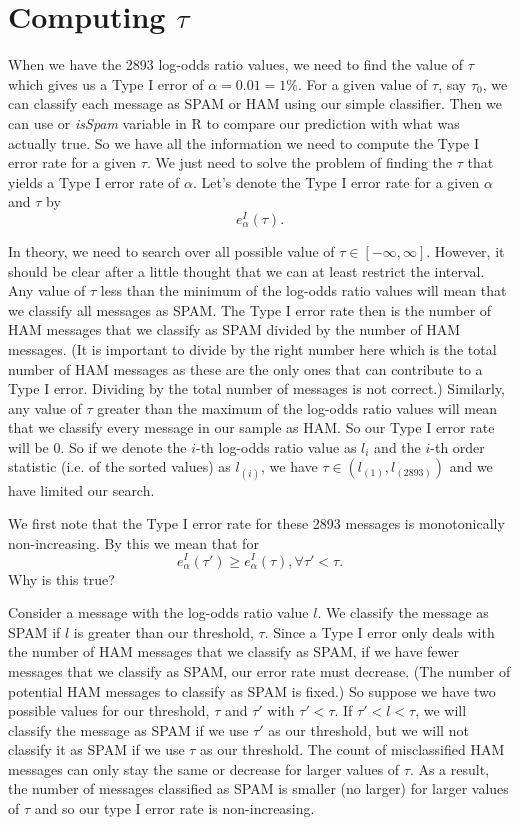 \documentclass{article}
\def\SVariable#1{\textsl{#1}}
\begin{document}
\section{Computing $\tau$}

When we have the 2893 log-odds ratio values, we need to find the value
of $\tau$ which gives us a Type I error of $\alpha = 0.01 = 1\%$.  For
a given value of $\tau$, say $\tau_0$, we can classify each message as
SPAM or HAM using our simple classifier.  Then we can use or
\SVariable{isSpam} variable in R to compare our prediction with what
was actually true.  So we have all the information we need to compute
the Type I error rate for a given $\tau$. We just need to solve the
problem of finding the $\tau$ that yields a Type I error rate of
$\alpha$.
Let's denote the Type I error  rate for a given 
$\alpha$ and $\tau$ by
$$ e_\alpha^I(\tau).$$

In theory, we need to search over all possible value of $\tau \in
[-\infty, \infty]$.  However, it should be clear after a little
thought that we can at least restrict the interval.  Any value of
$\tau$ less than the minimum of the log-odds ratio values will mean
that we classify all messages as SPAM. The Type I error rate then is
the number of HAM messages that we classify as SPAM divided by the
number of HAM messages.  (It is important to divide by the right
number here which is the total number of HAM messages as these are the
only ones that can contribute to a Type I error.  Dividing by the
total number of messages is not correct.)  Similarly, any value of
$\tau$ greater than the maximum of the log-odds ratio values will mean
that we classify every message in our sample as HAM. So our Type I
error rate will be $0$.  So if we denote the $i$-th log-odds ratio
value as $l_{i}$ and the $i$-th order statistic (i.e. of the sorted
values) as $l_{(i)}$, we have $\tau \in (l_{(1)}, l_{(2893)})$
and we have limited our search.

We first note that the Type I error rate for these 2893 messages is
monotonically non-increasing.  By this we mean that for
$$
  e_\alpha^I(\tau') \ge 
  e_\alpha^I(\tau),
\forall \tau' < \tau.
$$ Why is this true? 

Consider a message with the log-odds ratio value $l$.  We classify the
message as SPAM if $l$ is greater than our threshold, $\tau$.  Since a
Type I error only deals with the number of HAM messages that we
classify as SPAM, if we have fewer messages that we classify as SPAM,
our error rate must decrease. (The number of potential HAM messages to
classify as SPAM is fixed.)  So suppose we have two possible values
for our threshold, $\tau$ and $\tau'$ with $\tau' < \tau$.  If $\tau'
< l < \tau$, we will classify the message as SPAM if we use $\tau'$ as
our threshold, but we will not classify it as SPAM if we use $\tau$ as
our threshold.  The count of misclassified HAM messages can only stay
the same or decrease for larger values of $\tau$.  As a result, the
number of messages classified as SPAM is smaller (no larger) for
larger values of $\tau$ and so our type I error rate is
non-increasing.
\end{document}
